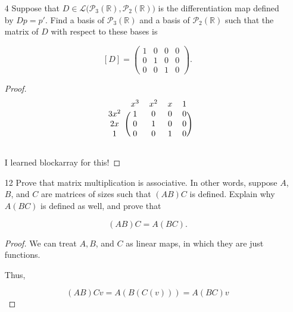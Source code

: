 \begin{enumerate}
\begin{proof}
        $$v_1, v_1 + v_2, \dots, v_n + v_1$$

        as our basis. 

        For any $j \in \{2, \dots, n\}$, $T(v_1 + v_j) = T(v_1) + T(v_j) = w_1 + \dots + w_n$, so our matrix is all ones as desired!
    \end{proof}

    \item[4] Suppose that $D\in\mathcal L\big(\mathcal P_3(\mathbb R),\mathcal P_2(\mathbb R)\big)$ is the differentiation map defined by $Dp=p'$. Find a basis of $\mathcal P_3(\mathbb R)$ and a basis of $\mathcal P_2(\mathbb R)$ such that the matrix of $D$ with respect to these bases is

    \[
    [D] = \begin{pmatrix}
    1 & 0 & 0 & 0 \\
    0 & 1 & 0 & 0 \\
    0 & 0 & 1 & 0
    \end{pmatrix}.
    \]

    \begin{proof}
        \[
        \begin{blockarray}{ccccc}
            & x^3 & x^2 & x & 1 \\
            \begin{block}{c(cccc)}
                3x^2 & 1 & 0 & 0 & 0 \\
                2x & 0 & 1 & 0 & 0 \\
                1 & 0 & 0 & 1 & 0 \\
            \end{block}
        \end{blockarray}
        \]

        I learned blockarray for this!
    \end{proof}

    \item[12] Prove that matrix multiplication is associative. In other words, suppose
    $A$, $B$, and $C$ are matrices of sizes such that $(AB)C$ is defined. Explain why
    $A(BC)$ is defined as well, and prove that

    \[ (AB)C = A(BC). \]

    \begin{proof}
        We can treat $A, B$, and $C$ as linear maps, in which they are just functions.

        Thus, 

        \[(AB)Cv = A(B(C(v))) = A(BC)v\]
    \end{proof}


\end{enumerate}
